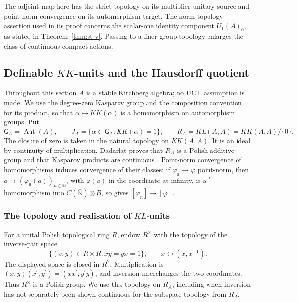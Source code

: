 \begin{remark}\label{rem:st-no-norm}
 The adjoint map here has the strict topology on its
multiplier-unitary source and point-norm convergence on its automorphism
target. The norm-topology assertion used in its proof concerns the
scalar-one identity component $U_1(A)_0$, as stated in
Theorem~\ref{thm:st-v}. Passing to a finer group topology enlarges the class
of continuous compact actions.
\end{remark}


\subsection{Definable \(KK\)-units and the Hausdorff
quotient}

\label{sec:st-definable-kk} Throughout this section $A$ is a stable Kirchberg
algebra; no UCT assumption is made. We use the degree-zero Kasparov group
and the composition convention for its product, so that $\alpha\mapsto
KK(\alpha)$ is a homomorphism on automorphism groups. Put 
\begin{equation*}
\mathsf G_A=\operatorname{Aut}(A),\qquad  J_A=\{\alpha\in \mathsf G_A:KK(\alpha)=1\},\qquad 
R_A=KL(A,A)=KK(A,A)/\overline{\{0\}}. 
\end{equation*}
The closure of zero is taken in the natural topology on $KK(A,A)$. It is an
ideal by continuity of multiplication. Dadarlat proves that $R_A$ is a
Polish additive group and that Kasparov products are continuous
\cite[Proposition~2.8 and Theorem~3.5]{Dadarlat2005}. Point-norm convergence
of homomorphisms induces convergence of their classes: if
$\varphi_n\to\varphi$ point-norm, then
$a\mapsto(\varphi_n(a))_{n\in\overline{\mathbb N}}$, with $\varphi(a)$ in
the coordinate at infinity, is a $^*$-homomorphism into
$C(\overline{\mathbb N})\otimes B$, so \cite[Theorem~3.3]{Dadarlat2005} gives
$[\varphi_n]\to[\varphi]$.


\subsubsection{The topology and realisation of \(KL\)-units}

For a unital Polish topological ring $R$, endow $R^\times$ with the topology
of the inverse-pair space 
\begin{equation}  \label{eq:st-inverse-pair}
\{(x,y)\in R\times R:xy=yx=1\}, \qquad x\longleftrightarrow(x,x^{-1}).
\end{equation}
The displayed space is closed in $R^2$. Multiplication is $(x,y)(x^{\prime
},y^{\prime })=(xx^{\prime },y^{\prime }y)$, and inversion interchanges the
two coordinates. Thus $R^\times$ is a Polish group. We use this topology on $R_A^\times$, including when inversion has not separately been shown
continuous for the subspace topology from $R_A$.

